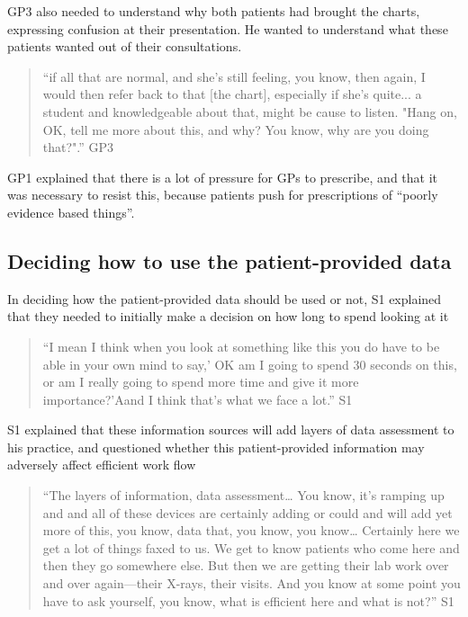 \documentclass{sigchi}
\begin{document}
GP3 also needed to understand why both patients had brought the charts, expressing confusion at their presentation. He wanted to understand what these patients wanted out of their consultations.

\begin{quote}
    ``if all that are normal, and she's still feeling, you know, then again, I would then refer back to that [the chart], especially if she's quite... a student and knowledgeable about that, might be cause to listen. "Hang on, OK, tell me more about this, and why? You know, why are you doing that?".'' GP3
\end{quote}

GP1 explained that there is a lot of pressure for GPs to prescribe, and that it was necessary to resist this, because patients push for prescriptions of ``poorly evidence based things''. 

\subsection{Deciding how to use the patient-provided data}

In deciding how the patient-provided data should be used or not, S1 explained that they needed to initially make a decision on how long to spend looking at it

\begin{quote}
``I mean I think when you look at something like this you do have to be able in your own mind to say,’ OK am I going to spend 30 seconds on this, or am I really going to spend more time and give it more importance?’Aand I think that's what we face a lot.'' S1
\end{quote}

S1 explained that these information sources will add layers of data assessment to his practice, and questioned whether this patient-provided information may adversely affect efficient work flow

\begin{quote}
    ``The layers of information, data assessment… You know, it's ramping up and and  all of these devices are certainly adding or could and will add yet more of this, you know, data that, you know, you know…  Certainly here we get a lot of things faxed to us. We get to know patients who come here and then they go somewhere else.  But then we are getting their lab work over and over again—their X-rays, their visits. And you know at some point you have to ask yourself, you know, what is efficient here and what is not?'' S1
\end{quote}
\end{document}
